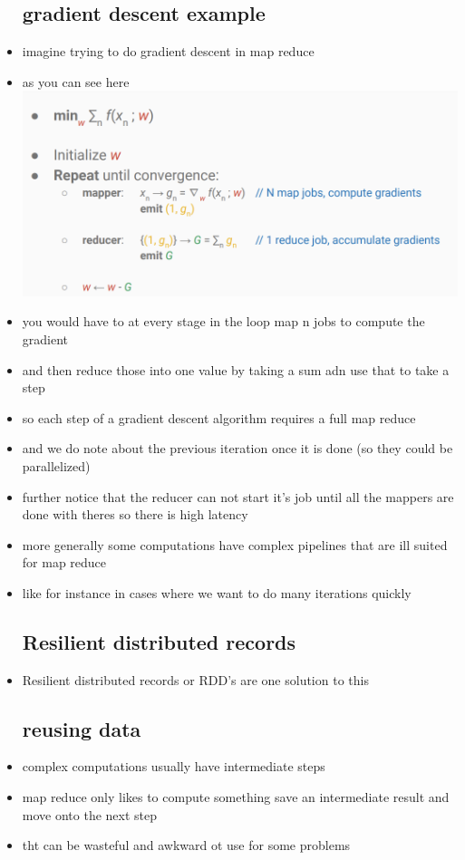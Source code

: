 \documentclass{article}
\begin{document}
\begin{itemize}
\subsection*{gradient descent example}
\item imagine trying to do gradient descent in map reduce 
\item  as you can see here \includegraphics{images/Screenshot 2023-05-10 at 1.03.43 AM.png}
\item you would have to at every stage in the loop map n jobs to compute the gradient 
\item and then reduce those into one value by taking a sum adn use that to take a step 
\item so each step of a gradient descent algorithm requires a full map reduce 
\item and we do note about the previous iteration once it is done (so they could be parallelized)
\item further notice that the reducer can not start it's job until all the mappers are done with theres so there is high latency
\item more generally some computations have complex pipelines that are ill suited for map reduce 
\item like for instance in cases where we want to do many iterations quickly
\subsection*{Resilient distributed records}
\item Resilient distributed records or RDD's are one solution to this
\subsection*{reusing data}
\item complex computations usually have intermediate steps 
\item map reduce only likes to compute something save an intermediate result and move onto the next step
\item tht can be wasteful and awkward ot use for some problems 

\end{itemize}
\end{document}
